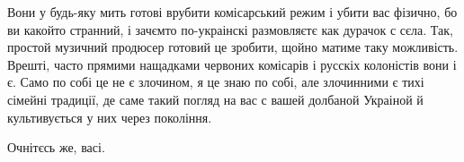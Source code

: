 Вони у будь-яку мить готові врубити комісарський режим і убити вас фізично, бо
ви какойто странний, і зачємто по-украінскі размовляєтє как дурачок с сєла.
Так, простой музичний продюсер готовий це зробити, щойно матиме таку
можливість. Врешті, часто прямими нащадками червоних комісарів і русскіх
колоністів вони і є. Само по собі це не є злочином, я це знаю по собі, але
злочинними є тихі сімейні традиції, де саме такий погляд на вас с вашей
долбаной Украіной й культивується у них через покоління.

Очнітєсь же, васі.

